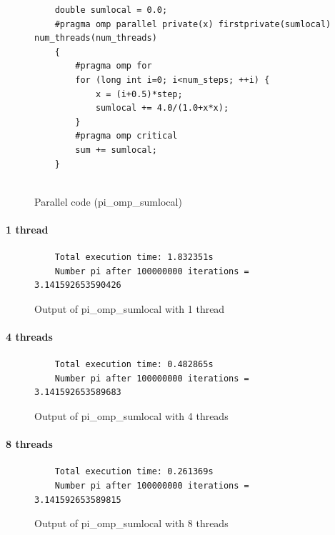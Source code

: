 \documentclass[12pt, a4paper]{article}
\begin{document}
\begin{figure}[H]
	\begin{lstlisting}
	double sumlocal = 0.0;
	#pragma omp parallel private(x) firstprivate(sumlocal) num_threads(num_threads)
    {
        #pragma omp for 
        for (long int i=0; i<num_steps; ++i) {
            x = (i+0.5)*step;
            sumlocal += 4.0/(1.0+x*x);
        }
        #pragma omp critical 
		sum += sumlocal;
    }


	\end{lstlisting}
	
	\caption{Parallel code (pi\_omp\_sumlocal)}
\end{figure}

\paragraph{1 thread}

\begin{figure}[H]
	\begin{lstlisting}
	Total execution time: 1.832351s
	Number pi after 100000000 iterations = 3.141592653590426		
	\end{lstlisting}
	\caption{Output of pi\_omp\_sumlocal with 1 thread}
\end{figure}

\paragraph{4 threads}

\begin{figure}[H]
	\begin{lstlisting}
	Total execution time: 0.482865s
	Number pi after 100000000 iterations = 3.141592653589683					
	\end{lstlisting}
	\caption{Output of pi\_omp\_sumlocal with 4 threads}
\end{figure}

\paragraph{8 threads}

\begin{figure}[H]
	\begin{lstlisting}
	Total execution time: 0.261369s
	Number pi after 100000000 iterations = 3.141592653589815		
	\end{lstlisting}
	\caption{Output of pi\_omp\_sumlocal with 8 threads}
\end{figure}
\end{document}
